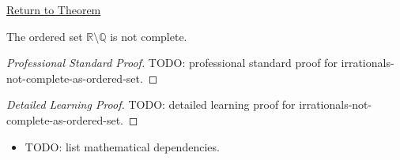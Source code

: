 \newpage
{}
\label{prf:irrationals-not-complete-as-ordered-set}

\begin{remark*}[Return]
\hyperref[thm:irrationals-not-complete-as-ordered-set]{Return to Theorem}
\end{remark*}

\begin{theorem*}
The ordered set $\mathbb{R}\setminus\mathbb{Q}$ is not complete.
\end{theorem*}

\begin{proof}[Professional Standard Proof]
\LRAProofBodyStart
TODO: professional standard proof for irrationals-not-complete-as-ordered-set.
\end{proof}

\begin{proof}[Detailed Learning Proof]
\LRAProofBodyStart
TODO: detailed learning proof for irrationals-not-complete-as-ordered-set.
\end{proof}

\begin{remark*}
\end{remark*}

\begin{dependencies}
\begin{itemize}
  \item TODO: list mathematical dependencies.
\end{itemize}
\end{dependencies}

\clearpage
